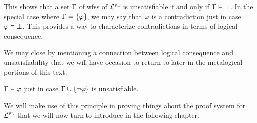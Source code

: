This shows that a set $\Gamma$ of wfss of $\mathcal{L}^{\textsc{pl}}$ is unsatisfiable if and only if $\Gamma \vDash \bot$.
In the special case where $\Gamma = \lbrace\varphi\rbrace$, we may say that $\varphi$ is a contradiction just in case $\varphi \vDash \bot$. 
This provides a way to characterize contradictions in terms of logical consequence.

We may close by mentioning a connection between logical consequence and unsatisfiability that we will have occasion to return to later in the metalogical portions of this text.

\begin{Lthm} \label{lemma:PL-unsat_consequence}
  $\Gamma \vDash \varphi$ just in case $\Gamma \cup \lbrace\neg \varphi\rbrace$ is unsatisfiable. 
\end{Lthm}


We will make use of this principle in proving things about the proof system for $\mathcal{L}^{\textsc{pl}}$ that we will now turn to introduce in the following chapter.






